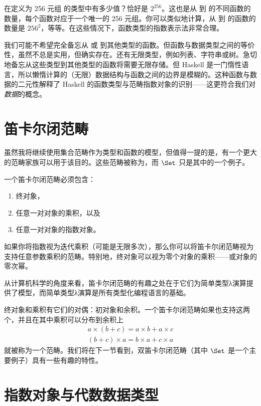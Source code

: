 在定义为 256 元组  的类型中有多少值？恰好是 $2^{256}$。这也是从  到  的不同函数的数量，每个函数对应于一个唯一的 256 元组。你可以类似地计算，从  到  的函数的数量是 $256^{2}$，等等。在这些情况下，函数类型的指数表示法非常合理。

我们可能不希望完全备忘从  或  到其他类型的函数。但函数与数据类型之间的等价性，虽然不总是实用，但确实存在。还有无限类型，例如列表、字符串或树。急切地备忘从这些类型到其他类型的函数将需要无限存储。但 Haskell 是一门惰性语言，所以懒惰计算的（无限）数据结构与函数之间的边界是模糊的。这种函数与数据的二元性解释了 Haskell 的函数类型与范畴指数对象的识别——这更符合我们对\emph{数据}的概念。

\section{笛卡尔闭范畴}

虽然我将继续使用集合范畴作为类型和函数的模型，但值得一提的是，有一个更大的范畴家族可以用于该目的。这些范畴被称为，而 $\Set$ 只是其中的一个例子。

一个笛卡尔闭范畴必须包含：

\begin{enumerate}
  \tightlist
  \item
  终对象，
  \item
  任意一对对象的乘积，以及
  \item
  任意一对对象的指数对象。
\end{enumerate}
如果你将指数视为迭代乘积（可能是无限多次），那么你可以将笛卡尔闭范畴视为支持任意参数乘积的范畴。特别地，终对象可以视为零个对象的乘积——或对象的零次幂。

从计算机科学的角度来看，笛卡尔闭范畴的有趣之处在于它们为简单类型λ演算提供了模型，而简单类型λ演算是所有类型化编程语言的基础。

终对象和乘积有它们的对偶：初对象和余积。一个笛卡尔闭范畴如果也支持这两个，并且在其中乘积可以分布到余积上
\begin{gather*}
  a \times (b + c) = a \times b + a \times c \\
  (b + c) \times a = b \times a + c \times a
\end{gather*}
就被称为一个范畴。我们将在下一节看到，双笛卡尔闭范畴（其中 $\Set$ 是一个主要例子）具有一些有趣的特性。

\section{指数对象与代数数据类型}

